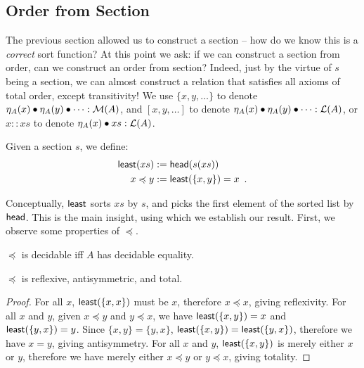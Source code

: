 \subsection{Order from Section}

The previous section allowed us to construct a section -- how do we know this is a \emph{correct} sort function?
%
At this point we ask: if we can construct a section from order, can we construct an order from section?
%
Indeed, just by the virtue of $s$ being a section, we can almost construct a relation that satisfies
all axioms of total order, except transitivity!
We use $\{x,y,\dots\}$ to denote $\eta_A(x) \mathbin{\bullet} \eta_A(y) \mathbin{\bullet} \dots : \mathcal{M}(A)$,
and $[x, y, \dots]$ to denote $\eta_A(x) \mathbin{\bullet} \eta_A(y) \mathbin{\bullet} \dots : \mathcal{L}(A)$,
or $x :: xs$ to denote $\eta_A(x) \mathbin{\bullet} xs : \mathcal{L}(A)$.

\begin{definition}
    \label{def:least}
    Given a section $s$, we define:
    \[
        \begin{aligned}
            \operatorname{\mathsf{least}}(xs) & := \operatorname{\mathsf{head}}(s(xs))                    \\
            x \preccurlyeq y & := \operatorname{\mathsf{least}}(\{x, y\}) = x \enspace .
        \end{aligned}
    \]
\end{definition}

Conceptually, $\operatorname{\mathsf{least}}$ sorts $xs$ by $s$, and picks the first element of the sorted list by~$\operatorname{\mathsf{head}}$.
This is the main insight, using which we establish our result.
First, we observe some properties of $\preccurlyeq$.

\begin{proposition}
    $\preccurlyeq$ is decidable iff $A$ has decidable equality.
\end{proposition}

\begin{proposition}
    $\preccurlyeq$ is reflexive, antisymmetric, and total.
\end{proposition}
\begin{proof}
    For all $x$, $\operatorname{\mathsf{least}}(\{x, x\})$ must be $x$, therefore $x \preccurlyeq x$, giving reflexivity.
    For all $x$ and $y$, given $x \preccurlyeq y$ and $y \preccurlyeq x$,
    we have $\operatorname{\mathsf{least}}(\{x, y\}) = x$ and $\operatorname{\mathsf{least}}(\{y, x\}) = y$.
    Since $\{x, y\} = \{y, x\}$, $\operatorname{\mathsf{least}}(\{x, y\}) = \operatorname{\mathsf{least}}(\{y, x\})$,
    therefore we have $x = y$, giving antisymmetry.
    For all $x$ and $y$, $\operatorname{\mathsf{least}}(\{x, y\})$ is merely either $x$ or $y$,
    therefore we have merely either $x \preccurlyeq y$ or $y \preccurlyeq x$, giving totality.
\end{proof}

